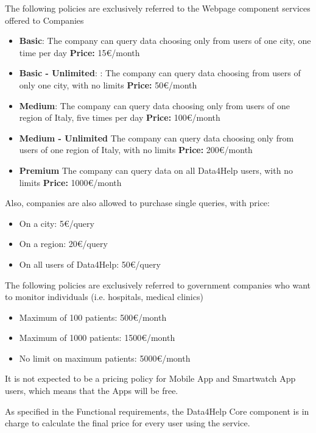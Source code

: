 The following policies are exclusively referred to the Webpage component services offered to Companies

\begin{itemize}
    \item \textbf{Basic}: The company can query data choosing only from users of one city, one time per day
     \textbf{Price:} 15\euro/month
    \item	\textbf{Basic - Unlimited}: : The company can query data choosing from users of only one city, with no limits
\textbf{Price:} 50\euro/month
    \item \textbf{Medium}: The company can query data choosing only from users of one region of Italy, five times per day
\textbf{Price:} 100\euro/month
    \item \textbf{Medium - Unlimited} The company can query data choosing only from users of one region of Italy, with no limits
\textbf{Price:} 200\euro/month
    \item \textbf{Premium} The company can query data on all Data4Help users, with no limits
\textbf{Price:} 1000\euro/month
\end{itemize}

\noindent Also, companies are also allowed to purchase single queries, with price:

\begin{itemize}
    \item On a city: 5\euro/query
    \item On a region: 20\euro/query
    \item On all users of Data4Help: 50\euro/query
\end{itemize}

\noindent The following policies are exclusively referred to government companies who want to monitor individuals (i.e. hospitals, medical clinics) 

\begin{itemize}
    \item Maximum of 100 patients:
500\euro/month
    \item Maximum of 1000 patients: 
1500\euro/month
    \item No limit on maximum patients:
5000\euro/month
\end{itemize}




\noindent It is not expected to be a pricing policy for Mobile App and Smartwatch App users, which means that the Apps will be free.

\noindent As specified in the Functional requirements, the Data4Help Core component is in charge to calculate the final price for every user using the service.








